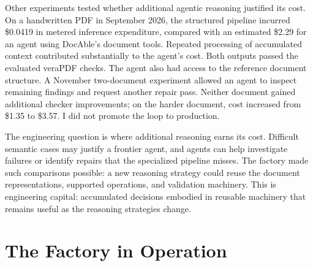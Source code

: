 
Other experiments tested whether additional agentic reasoning justified its cost. On a handwritten PDF in September 2026, the structured pipeline incurred \$0.0419 in metered inference expenditure, compared with an estimated \$2.29 for an agent using DocAble's document tools. Repeated processing of accumulated context contributed substantially to the agent's cost. Both outputs passed the evaluated veraPDF checks. The agent also had access to the reference document structure. A November two-document experiment allowed an agent to inspect remaining findings and request another repair pass. Neither document gained additional checker improvements; on the harder document, cost increased from \$1.35 to \$3.57. I did not promote the loop to production.

The engineering question is where additional reasoning earns its cost. Difficult semantic cases may justify a frontier agent, and agents can help investigate failures or identify repairs that the specialized pipeline misses. The factory made such comparisons possible: a new reasoning strategy could reuse the document representations, supported operations, and validation machinery. This is engineering capital: accumulated decisions embodied in reusable machinery that remains useful as the reasoning strategies change.

\section{The Factory in Operation}\label{heading:the-factory-in-operation}

